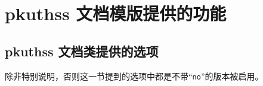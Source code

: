%
%
%
%

\chapter{pkuthss 文档模版提供的功能}
\section{pkuthss 文档类提供的选项}\label{sec:options}

除非特别说明，否则这一节提到的选项中都是不带“\verb|no|”的版本被启用。

